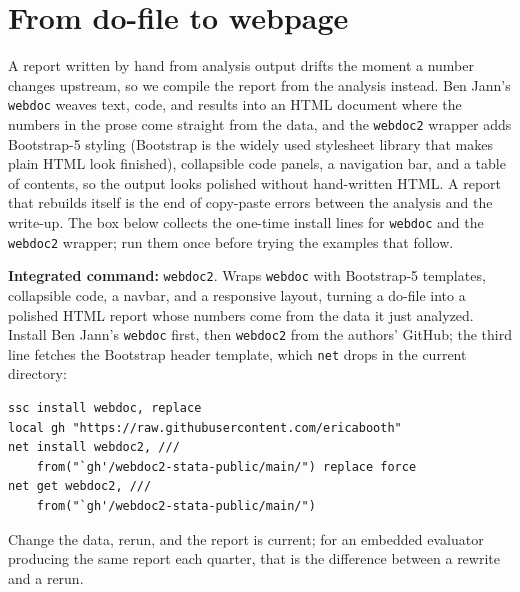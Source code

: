 \documentclass[
    a4paper,
    fontsize=10pt,
    twoside=true,
    numbers=noenddot,
]{kaobook}
\begin{document}
\section{From do-file to webpage}
A report written by hand from analysis output drifts the moment a number changes upstream, so we compile the report from the analysis instead. Ben Jann's \texttt{webdoc} weaves text, code, and results into an HTML document where the numbers in the prose come straight from the data, and the \texttt{webdoc2} wrapper adds Bootstrap-5 styling (Bootstrap is the widely used stylesheet library that makes plain HTML look finished), collapsible code panels, a navigation bar, and a table of contents, so the output looks polished without hand-written HTML. A report that rebuilds itself is the end of copy-paste errors between the analysis and the write-up. The box below collects the one-time install lines for \texttt{webdoc} and the \texttt{webdoc2} wrapper; run them once before trying the examples that follow.

\begin{kaobox}[frametitle=Package Integration: \texttt{webdoc2}]
\textbf{Integrated command:} \texttt{webdoc2}. Wraps \texttt{webdoc} with Bootstrap-5 templates, collapsible code, a navbar, and a responsive layout, turning a do-file into a polished HTML report whose numbers come from the data it just analyzed. Install Ben Jann's \texttt{webdoc} first, then \texttt{webdoc2} from the authors' GitHub; the third line fetches the Bootstrap header template, which \texttt{net} drops in the current directory:
\par
{\footnotesize
\begin{verbatim}
ssc install webdoc, replace
local gh "https://raw.githubusercontent.com/ericabooth"
net install webdoc2, ///
    from("`gh'/webdoc2-stata-public/main/") replace force
net get webdoc2, ///
    from("`gh'/webdoc2-stata-public/main/")
\end{verbatim}
}
\end{kaobox}

Change the data, rerun, and the report is current; for an embedded evaluator producing the same report each quarter, that is the difference between a rewrite and a rerun.
\end{document}
